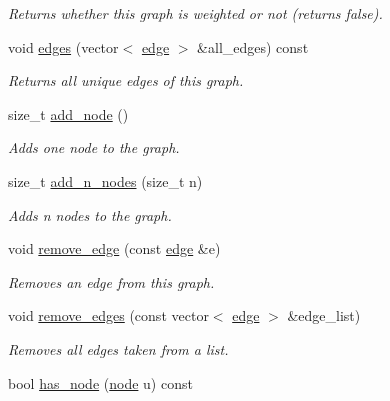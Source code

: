 \begin{DoxyCompactItemize}
\begin{DoxyCompactList}\small\item\em Returns whether this graph is weighted or not (returns false). \end{DoxyCompactList}\item 
void \hyperlink{classlgraph_1_1utils_1_1uxgraph_ade877f3a9cf71d844cfe7b6c4f8aae10}{edges} (vector$<$ \hyperlink{namespacelgraph_1_1utils_a6510284ce1b1ae5dc97ce5d2de426e10}{edge} $>$ \&all\-\_\-edges) const 
\begin{DoxyCompactList}\small\item\em Returns all unique edges of this graph. \end{DoxyCompactList}\item 
size\-\_\-t \hyperlink{classlgraph_1_1utils_1_1xxgraph_af41baf2c098e872731ad646aeec1b382}{add\-\_\-node} ()
\begin{DoxyCompactList}\small\item\em Adds one node to the graph. \end{DoxyCompactList}\item 
size\-\_\-t \hyperlink{classlgraph_1_1utils_1_1xxgraph_ae1283d13858ea06a6999626a01d12e4b}{add\-\_\-n\-\_\-nodes} (size\-\_\-t n)
\begin{DoxyCompactList}\small\item\em Adds {\itshape n} nodes to the graph. \end{DoxyCompactList}\item 
void \hyperlink{classlgraph_1_1utils_1_1xxgraph_af826c05492f237d7727f88ebab033001}{remove\-\_\-edge} (const \hyperlink{namespacelgraph_1_1utils_a6510284ce1b1ae5dc97ce5d2de426e10}{edge} \&e)
\begin{DoxyCompactList}\small\item\em Removes an edge from this graph. \end{DoxyCompactList}\item 
void \hyperlink{classlgraph_1_1utils_1_1xxgraph_a747da8a567d232081199499f23821926}{remove\-\_\-edges} (const vector$<$ \hyperlink{namespacelgraph_1_1utils_a6510284ce1b1ae5dc97ce5d2de426e10}{edge} $>$ \&edge\-\_\-list)
\begin{DoxyCompactList}\small\item\em Removes all edges taken from a list. \end{DoxyCompactList}\item 
\hypertarget{classlgraph_1_1utils_1_1xxgraph_a026ab064c2be26790cc1f547be2157c9}{bool \hyperlink{classlgraph_1_1utils_1_1xxgraph_a026ab064c2be26790cc1f547be2157c9}{has\-\_\-node} (\hyperlink{namespacelgraph_1_1utils_a7bd66ede3805ef121bc2835bd48de0cf}{node} u) const }\label{classlgraph_1_1utils_1_1xxgraph_a026ab064c2be26790cc1f547be2157c9}


\end{DoxyCompactItemize}
